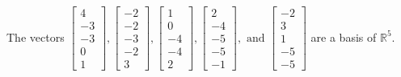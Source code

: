 \begin{exercise}
\begin{exerciseStatement}
  \end{exerciseStatement}
  \begin{exerciseAnswer}
   The vectors \(\left[\begin{array}{r}
4 \\
-3 \\
-3 \\
0 \\
1
\end{array}\right] , \left[\begin{array}{r}
-2 \\
-2 \\
-3 \\
-2 \\
3
\end{array}\right] , \left[\begin{array}{r}
1 \\
0 \\
-4 \\
-4 \\
2
\end{array}\right] , \left[\begin{array}{r}
2 \\
-4 \\
-5 \\
-5 \\
-1
\end{array}\right] , \text{ and } \left[\begin{array}{r}
-2 \\
3 \\
1 \\
-5 \\
-5
\end{array}\right]\) 
  	 are  a basis of \(\mathbb{R}^5\).
  


  \end{exerciseAnswer}
\end{exercise}